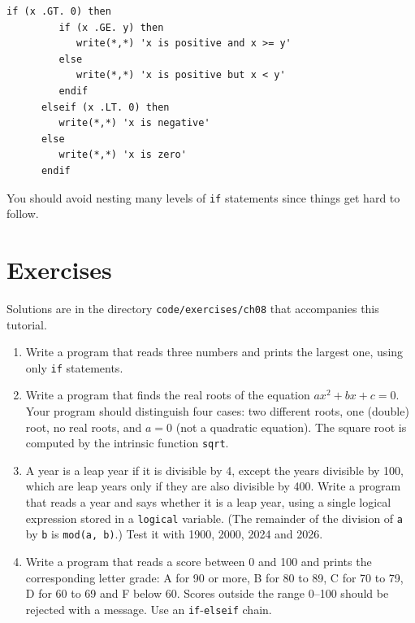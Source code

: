 \begin{lstlisting}[style=fortran77]
      if (x .GT. 0) then
         if (x .GE. y) then
            write(*,*) 'x is positive and x >= y'
         else
            write(*,*) 'x is positive but x < y'
         endif
      elseif (x .LT. 0) then
         write(*,*) 'x is negative'
      else
         write(*,*) 'x is zero'
      endif
\end{lstlisting}

You should avoid nesting many levels of \texttt{if} statements since things get hard to follow.

\section{Exercises}

Solutions are in the directory \texttt{code/exercises/ch08} that accompanies this tutorial.

\begin{enumerate}
    \item Write a program that reads three numbers and prints the largest one, using only \texttt{if} statements.
    \item Write a program that finds the real roots of the equation $ax^2 + bx + c = 0$. Your program should distinguish four cases: two different roots, one (double) root, no real roots, and $a = 0$ (not a quadratic equation). The square root is computed by the intrinsic function \texttt{sqrt}.
    \item A year is a leap year if it is divisible by 4, except the years divisible by 100, which are leap years only if they are also divisible by 400. Write a program that reads a year and says whether it is a leap year, using a single logical expression stored in a \texttt{logical} variable. (The remainder of the division of \texttt{a} by \texttt{b} is \texttt{mod(a, b)}.) Test it with 1900, 2000, 2024 and 2026.
    \item Write a program that reads a score between 0 and 100 and prints the corresponding letter grade: A for 90 or more, B for 80 to 89, C for 70 to 79, D for 60 to 69 and F below 60. Scores outside the range 0--100 should be rejected with a message. Use an \texttt{if}-\texttt{elseif} chain.
\end{enumerate}
